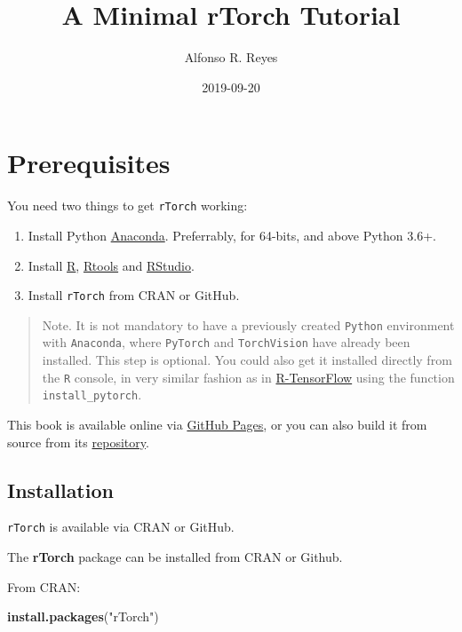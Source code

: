 \documentclass[]{book}
\title{A Minimal rTorch Tutorial}
\author{Alfonso R. Reyes}
\date{2019-09-20}
\newenvironment{Shaded}{\begin{snugshade}}{\end{snugshade}}
\newcommand{\KeywordTok}[1]{\textcolor[rgb]{0.13,0.29,0.53}{\textbf{#1}}}
\newcommand{\NormalTok}[1]{#1}
\newcommand{\StringTok}[1]{\textcolor[rgb]{0.31,0.60,0.02}{#1}}
\begin{document}
\maketitle

{
\setcounter{tocdepth}{1}
\tableofcontents
}
\hypertarget{prerequisites}{%
\chapter*{Prerequisites}\label{prerequisites}}

You need two things to get \texttt{rTorch} working:

\begin{enumerate}
\def\labelenumi{\arabic{enumi}.}
\item
  Install Python \href{}{Anaconda}. Preferrably, for 64-bits, and above Python 3.6+.
\item
  Install \href{}{R}, \href{}{Rtools} and \href{}{RStudio}.
\item
  Install \texttt{rTorch} from CRAN or GitHub.
\end{enumerate}

\begin{quote}
Note. It is not mandatory to have a previously created \texttt{Python} environment with \texttt{Anaconda}, where \texttt{PyTorch} and \texttt{TorchVision} have already been installed. This step is optional. You could also get it installed directly from the \texttt{R} console, in very similar fashion as in \href{}{R-TensorFlow} using the function \texttt{install\_pytorch}.
\end{quote}

This book is available online via \href{}{GitHub Pages}, or you can also build it from source from its \href{}{repository}.

\hypertarget{installation}{%
\section*{Installation}\label{installation}}

\texttt{rTorch} is available via CRAN or GitHub.

The \textbf{rTorch} package can be installed from CRAN or Github.

From CRAN:

\begin{Shaded}
\begin{Highlighting}[]
\KeywordTok{install.packages}\NormalTok{(}\StringTok{"rTorch"}\NormalTok{)}
\end{Highlighting}
\end{Shaded}
\end{document}
